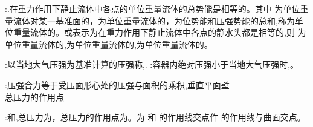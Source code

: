 :.在重力作用下静止流体中各点的单位重量流体的总势能是相等的。其中 为单位重量流体对某一基准面的，为单位重量流体的，为位势能和压强势能的总和,称为单位重量流体的。或表示为在重力作用下静止流体中各点的静水头都是相等的,则 为单位重量流体的,为单位重量流体的,为单位重量流体的。

\divider


:以当地大气压强为基准计算的压强称,.
:容器内绝对压强小于当地大气压强时,。

\divider


:压强合力等于受压面形心处的压强与面积的乘积,垂直平面壁\\
总压力的作用点 

:和,总压力为，总压力的作用点为。为  和  的作用线交点作  的作用线与曲面交点。

\divider

